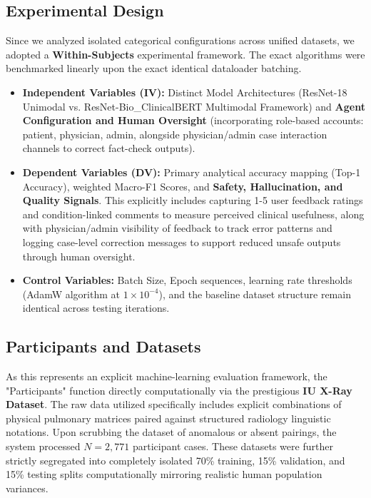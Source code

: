 \documentclass[11pt,a4paper]{article}
\begin{document}
\subsection{Experimental Design}
Since we analyzed isolated categorical configurations across unified datasets, we adopted a \textbf{Within-Subjects} experimental framework. The exact algorithms were benchmarked linearly upon the exact identical dataloader batching.
\begin{itemize}
    \item \textbf{Independent Variables (IV):} Distinct Model Architectures (ResNet-18 Unimodal vs. ResNet-Bio\_ClinicalBERT Multimodal Framework) and \textbf{Agent Configuration and Human Oversight} (incorporating role-based accounts: patient, physician, admin, alongside physician/admin case interaction channels to correct fact-check outputs).
    \item \textbf{Dependent Variables (DV):} Primary analytical accuracy mapping (Top-1 Accuracy), weighted Macro-F1 Scores, and \textbf{Safety, Hallucination, and Quality Signals}. This explicitly includes capturing 1-5 user feedback ratings and condition-linked comments to measure perceived clinical usefulness, along with physician/admin visibility of feedback to track error patterns and logging case-level correction messages to support reduced unsafe outputs through human oversight.
    \item \textbf{Control Variables:} Batch Size, Epoch sequences, learning rate thresholds (AdamW algorithm at $1 \times 10^{-4}$), and the baseline dataset structure remain identical across testing iterations.
\end{itemize}

\subsection{Participants and Datasets}
As this represents an explicit machine-learning evaluation framework, the "Participants" function directly computationally via the prestigious \textbf{IU X-Ray Dataset}. The raw data utilized specifically includes explicit combinations of physical pulmonary matrices paired against structured radiology linguistic notations. Upon scrubbing the dataset of anomalous or absent pairings, the system processed $N = 2,771$ participant cases. These datasets were further strictly segregated into completely isolated 70\% training, 15\% validation, and 15\% testing splits computationally mirroring realistic human population variances.
\end{document}
